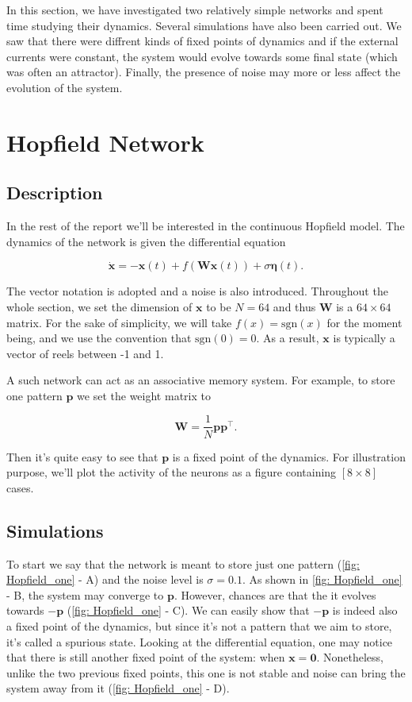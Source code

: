In this section, we have investigated two relatively simple networks and spent
time studying their dynamics. Several simulations have also been carried out.
We saw that there were diffrent kinds of fixed points of dynamics and if the
external currents were constant, the system would evolve towards some final 
state (which was often an attractor). Finally, the presence of noise may more
or less affect the evolution of the system.


\section{Hopfield Network}

\subsection{Description}

In the rest of the report we'll be interested in the continuous Hopfield 
model. The dynamics of the network is given the differential equation

\[\dot{\mathbf{x}} = -\mathbf{x}(t) + f(\mathbf{Wx}(t)) + 
  \sigma\mathbf{\eta}(t).\]

\noindent
The vector notation is adopted and a noise is also introduced.
Throughout the whole section, we set the dimension of $\mathbf{x}$ to be 
$N=64$ and thus $\mathbf{W}$ is a $64\times64$ matrix. For the sake of 
simplicity, we will take $f(x) = \mathrm{sgn}(x)$ for the moment being, and 
we use the convention that $\mathrm{sgn}(0) = 0$. As a result, $\mathbf{x}$
is typically a vector of reels between -1 and 1.

A such network can act as an associative memory system. For example, to store
one pattern $\mathbf{p}$ we set the weight matrix to 

\[\mathbf{W} = \frac{1}{N} \mathbf{p}\mathbf{p}^{\top}.\]

\noindent
Then it's quite easy to see that $\mathbf{p}$ is a fixed point of the
dynamics. For illustration purpose, we'll plot the activity of the neurons
as a figure containing $[8 \times 8]$ cases.

\subsection{Simulations}

To start we say that the network is meant to store just one pattern 
(\autoref{fig: Hopfield_one} - \textsf{A}) and the
noise level is $\sigma = 0.1$. As shown in \autoref{fig: Hopfield_one} -
\textsf{B}, the system may converge to $\mathbf{p}$. However, chances are 
that the it evolves towards $-\mathbf{p}$ 
(\autoref{fig: Hopfield_one} - \textsf{C}). We can easily show
that $-\mathbf{p}$ is indeed also a fixed point of the dynamics, but since
it's not a pattern that we aim to store, it's called a spurious state.
Looking at the differential equation, one may notice that there is still
another fixed point of the system: when $\mathbf{x} = \mathbf{0}$. 
Nonetheless, unlike the two previous fixed points, this one is not stable
and noise can bring the system away from it (\autoref{fig: Hopfield_one} -
\textsf{D}).

